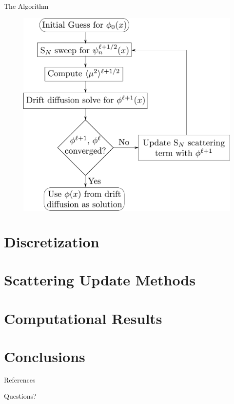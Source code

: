 \documentclass[10pt]{beamer}
\begin{document}
\begin{frame}{The Algorithm}

	\begin{figure}

		\includegraphics[width=.8\textwidth]{figs/vef_flow.pdf}

	\end{figure}

\end{frame}

\section{Discretization}

\section{Scattering Update Methods}

\section{Computational Results}

\section{Conclusions}


\appendix

\begin{frame}[allowframebreaks]{References}

	\nocite{*}
	
	

\end{frame}

\begin{frame}[standout]
  Questions?
\end{frame}
\end{document}
